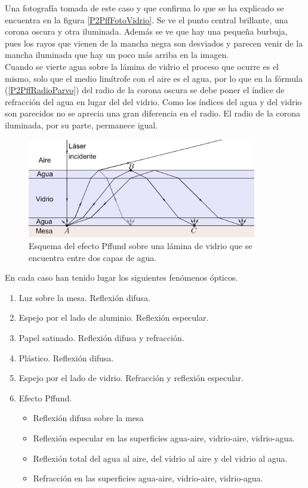\documentclass[12pt]{article}
\numberwithin{table}{section}
\numberwithin{figure}{section}
\numberwithin{equation}{section}
\begin{document}
Una fotografía tomada de este caso y que confirma lo que se ha explicado se encuentra en la figura \ref{P2PffFotoVidrio}. Se ve el punto central brillante, una corona oscura y otra iluminada. Además se ve que hay una pequeña burbuja, pues los rayos que vienen de la mancha negra son desviados y parecen venir de la mancha iluminada que hay un poco más arriba en la imagen.
\\

Cuando se vierte agua sobre la lámina de vidrio el proceso que ocurre es el mismo, solo que el medio limítrofe con el aire es el agua, por lo que en la fórmula (\ref{P2PffRadioParvo}) del radio de la corona oscura se debe poner el índice de refracción del agua en lugar del del vidrio. Como los índices del agua y del vidrio son parecidos no se aprecia una gran diferencia en el radio. El radio de la corona iluminada, por su parte, permanece igual.

\begin{figure}[!ht]
\begin{center}
\includegraphics[width=10cm]{P2PffAgria.png}
\caption{Esquema del efecto Pffund sobre una lámina de vidrio que se encuentra entre dos capas de agua.}
\label{P2PffAgria}
\end{center}
\end{figure}

En cada caso han tenido lugar los siguientes fenómenos ópticos.
\begin{enumerate}
\item Luz sobre la mesa. Reflexión difusa.
\item Espejo por el lado de aluminio. Reflexión especular.
\item Papel satinado. Reflexión difusa y refracción.
\item Plástico. Reflexión difusa.
\item Espejo por el lado de vidrio. Refracción y reflexión especular.
\item Efecto Pffund.
\begin{itemize}
\item Reflexión difusa sobre la mesa
\item Reflexión especular en las superficies agua-aire, vidrio-aire, vidrio-agua.
\item Reflexión total del agua al aire, del vidrio al aire y del vidrio al agua.
\item Refracción en las superficies agua-aire, vidrio-aire, vidrio-agua.
\end{itemize}
\end{enumerate}
\end{document}
